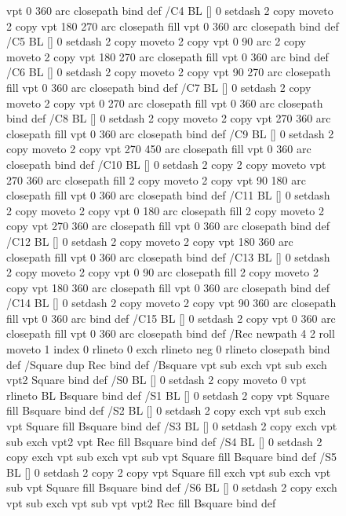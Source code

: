 \documentclass{LMCS}
\begin{document}
\begin{figure}[!tbp]
\begin{minipage}[b]{.45\linewidth}
{{{{               vpt 0 360 arc closepath } bind def
/C4 { BL [] 0 setdash 2 copy moveto
       2 copy  vpt 180 270 arc closepath fill
               vpt 0 360 arc closepath } bind def
/C5 { BL [] 0 setdash 2 copy moveto
       2 copy  vpt 0 90 arc
       2 copy moveto
       2 copy  vpt 180 270 arc closepath fill
               vpt 0 360 arc } bind def
/C6 { BL [] 0 setdash 2 copy moveto
      2 copy  vpt 90 270 arc closepath fill
              vpt 0 360 arc closepath } bind def
/C7 { BL [] 0 setdash 2 copy moveto
      2 copy  vpt 0 270 arc closepath fill
              vpt 0 360 arc closepath } bind def
/C8 { BL [] 0 setdash 2 copy moveto
      2 copy vpt 270 360 arc closepath fill
              vpt 0 360 arc closepath } bind def
/C9 { BL [] 0 setdash 2 copy moveto
      2 copy  vpt 270 450 arc closepath fill
              vpt 0 360 arc closepath } bind def
/C10 { BL [] 0 setdash 2 copy 2 copy moveto vpt 270 360 arc closepath fill
       2 copy moveto
       2 copy vpt 90 180 arc closepath fill
               vpt 0 360 arc closepath } bind def
/C11 { BL [] 0 setdash 2 copy moveto
       2 copy  vpt 0 180 arc closepath fill
       2 copy moveto
       2 copy  vpt 270 360 arc closepath fill
               vpt 0 360 arc closepath } bind def
/C12 { BL [] 0 setdash 2 copy moveto
       2 copy  vpt 180 360 arc closepath fill
               vpt 0 360 arc closepath } bind def
/C13 { BL [] 0 setdash  2 copy moveto
       2 copy  vpt 0 90 arc closepath fill
       2 copy moveto
       2 copy  vpt 180 360 arc closepath fill
               vpt 0 360 arc closepath } bind def
/C14 { BL [] 0 setdash 2 copy moveto
       2 copy  vpt 90 360 arc closepath fill
               vpt 0 360 arc } bind def
/C15 { BL [] 0 setdash 2 copy vpt 0 360 arc closepath fill
               vpt 0 360 arc closepath } bind def
/Rec   { newpath 4 2 roll moveto 1 index 0 rlineto 0 exch rlineto
       neg 0 rlineto closepath } bind def
/Square { dup Rec } bind def
/Bsquare { vpt sub exch vpt sub exch vpt2 Square } bind def
/S0 { BL [] 0 setdash 2 copy moveto 0 vpt rlineto BL Bsquare } bind def
/S1 { BL [] 0 setdash 2 copy vpt Square fill Bsquare } bind def
/S2 { BL [] 0 setdash 2 copy exch vpt sub exch vpt Square fill Bsquare } bind def
/S3 { BL [] 0 setdash 2 copy exch vpt sub exch vpt2 vpt Rec fill Bsquare } bind def
/S4 { BL [] 0 setdash 2 copy exch vpt sub exch vpt sub vpt Square fill Bsquare } bind def
/S5 { BL [] 0 setdash 2 copy 2 copy vpt Square fill
       exch vpt sub exch vpt sub vpt Square fill Bsquare } bind def
/S6 { BL [] 0 setdash 2 copy exch vpt sub exch vpt sub vpt vpt2 Rec fill Bsquare } bind def
}}}
\end{minipage}
\end{figure}
\end{document}
